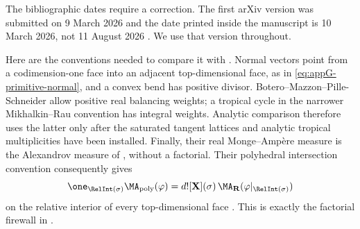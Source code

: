 The bibliographic dates require a correction.  The first arXiv version was
submitted on 9 March 2026 and the date printed inside the manuscript is
10 March 2026, not 11 August 2026 \cite{BMPS26}.  We use that version
throughout.

Here are the conventions needed to compare it with
.  Normal vectors point from a codimension-one
face into an adjacent top-dimensional face, as in
\eqref{eq:appG-primitive-normal}, and a convex bend has positive divisor.
Botero--Mazzon--Pille-Schneider allow positive real balancing weights; a
tropical cycle in the narrower Mikhalkin--Rau convention has integral
weights.  Analytic comparison therefore uses the latter only after the
saturated tangent lattices and analytic tropical multiplicities have been
installed.  Finally, their real Monge--Amp\`ere measure is the Alexandrov
measure of , without a factorial.  Their
polyhedral intersection convention consequently gives
\begin{equation}
 \one_{\RelInt(\sigma)}\MA_{\mathrm{poly}}(\varphi)
 =d![\mathbf X](\sigma)\,
   \MA_{\mathbf R}(\varphi|_{\RelInt(\sigma)})
 \label{eq:frontier-polyhedral-real-local}
\end{equation}
on the relative interior of every top-dimensional face
\cite[Propositions~4.12 and~4.20]{BMPS26}.  This is exactly the factorial
firewall in .

